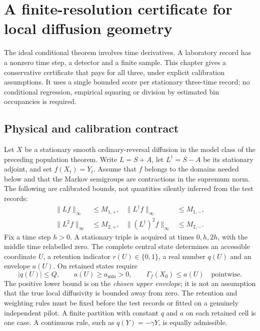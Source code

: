 \chapter{A finite-resolution certificate for local diffusion geometry}
\label{ch:og-finite}

The ideal conditional theorem involves time derivatives.  A laboratory record
has a nonzero time step, a detector and a finite sample.  This chapter gives a
conservative certificate that pays for all three, under explicit calibration
assumptions.  It uses a single bounded score per stationary three-time record;
no conditional regression, empirical squaring or division by estimated bin
occupancies is required.

\section{Physical and calibration contract}
Let $X$ be a stationary smooth ordinary-reversal diffusion in the model class
of the preceding population theorem. Write $L=S+A$, let $L^\dagger=S-A$ be its
stationary adjoint, and set $f(X_t)=Y_t$.  Assume that $f$ belongs to the domains
needed below and that the Markov semigroups are contractions in the supremum
norm.  The following are calibrated bounds, not quantities silently inferred
from the test records:
\begin{align}
 \|Lf\|_\infty&\le M_{1,+},&
 \|L^\dagger f\|_\infty&\le M_{1,-},\\
 \|L^2f\|_\infty&\le M_{2,+},&
 \|(L^\dagger)^2f\|_\infty&\le M_{2,-}.
\end{align}
Fix a time step $h>0$. A stationary triple is acquired at times $0,h,2h$,
with the middle time relabelled zero. The complete central state determines an
accessible coordinate $U$, a retention indicator $r(U)\in\{0,1\}$, a real
number $q(U)$ and an envelope $a(U)$. On retained states require
\begin{equation}
 |q(U)|\le Q,\qquad a(U)\ge a_{\min}>0,
 \qquad \Gamma_f(X_0)\le a(U) \quad\text{pointwise}.
 \label{eq:og-finite-contract}
\end{equation}
The positive lower bound is on the \emph{chosen upper envelope}; it is not an
assumption that the true local diffusivity is bounded away from zero. The
retention and weighting rules must be fixed before the test records or fitted
on a genuinely independent pilot. A finite partition with constant $q$ and
$a$ on each retained cell is one case. A continuous rule, such as
$q(Y)=-\gamma Y$, is equally admissible.

